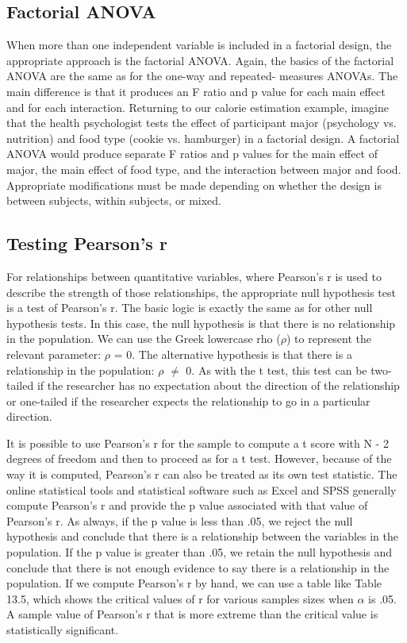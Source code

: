 \subsection{Factorial ANOVA}

When more than one independent variable is included in a factorial design, the appropriate approach is the factorial ANOVA. Again, the basics of the factorial ANOVA are the same as for the one-way and repeated- measures ANOVAs. The main difference is that it produces an F ratio and p value for each main effect and for each interaction. Returning to our calorie estimation example, imagine that the health psychologist tests the effect of participant major (psychology vs. nutrition) and food type (cookie vs. hamburger) in a factorial design. A factorial ANOVA would produce separate F ratios and p values for the main effect of major, the main effect of food type, and the interaction between major and food. Appropriate modifications must be made depending on whether the design is between subjects, within subjects, or mixed.


\subsection{Testing Pearson's r}


For relationships between quantitative variables, where Pearson's r is used to describe the strength of those relationships, the appropriate null hypothesis test is a test of Pearson's r. The basic logic is exactly the same as for other null hypothesis tests. In this case, the null hypothesis is that there is no relationship in the population. We can use the Greek lowercase rho ($\rho$) to represent the relevant parameter: $\rho$ = 0. The alternative hypothesis is that there is a relationship in the population: $\rho$ $\neq$ 0. As with the t test, this test can be two-tailed if the researcher has no expectation about the direction of the relationship or one-tailed if the researcher expects the relationship to go in a particular direction.


It is possible to use Pearson's r for the sample to compute a t score with N - 2 degrees of freedom and then to proceed as for a t test. However, because of the way it is computed, Pearson's r can also be treated as its own test statistic. The online statistical tools and statistical software such as Excel and SPSS generally compute Pearson's r and provide the p value associated with that value of Pearson's r. As always, if the p value is less than .05, we reject the null hypothesis and conclude that there is a relationship between the variables in the population. If the p value is greater than .05, we retain the null hypothesis and conclude that there is not enough evidence to say there is a relationship in the population. If we compute Pearson's r by hand, we can use a table like Table 13.5, which shows the critical values of r for various samples sizes when $\alpha$ is .05. A sample value of Pearson's r that is more extreme than the critical value is statistically significant.



